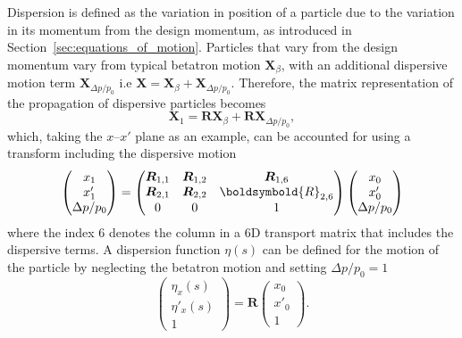 \documentclass[../main.tex]{subfiles}
\begin{document}
Dispersion is defined as the variation in position of a particle due to the variation in its momentum from the design momentum, as introduced in Section~\ref{sec:equations_of_motion}. Particles that vary from the design momentum vary from typical betatron motion $\boldsymbol{X}_{\beta}$, with an additional dispersive motion term $\boldsymbol{X}_{\Delta p/p_{0}}$ i.e $\boldsymbol{X} = \boldsymbol{X}_{\beta} + \boldsymbol{X}_{\Delta p/p_{0}}$. Therefore, the matrix representation of the propagation of dispersive particles becomes
\begin{equation}
\boldsymbol{X}_{1} = \boldsymbol{R}\boldsymbol{X}_{\beta} + \boldsymbol{R}\boldsymbol{X}_{\Delta p/p_{0}},
\label{eq:dispersive_transport_matrix_propagation}    
\end{equation}
which, taking the $x$--$x'$ plane as an example, can be accounted for using a transform including the dispersive motion
\begin{equation}
\begin{pmatrix}
x_{1} \\
x'_{1} \\
\Delta p /p_{0}
\end{pmatrix}
=
\begin{pmatrix}
\boldsymbol{R}_{1,1} & \boldsymbol{R}_{1,2} & \boldsymbol{R}_{1,6} \\
\boldsymbol{R}_{2,1} & \boldsymbol{R}_{2,2} & \boldsymbold{R}_{2,6} \\
0 & 0 & 1
\end{pmatrix}
\begin{pmatrix}
x_{0} \\
x'_{0} \\
\Delta p / p_{0} 
\end{pmatrix}
\label{eq:dispersive_transport_simplified}
\end{equation}
where the index 6 denotes the column in a 6D transport matrix that includes the dispersive terms. A dispersion function $\eta\left(s\right)$ can be defined for the motion of the particle by neglecting the betatron motion and setting $\Delta p/p_{0}=1$
\begin{equation}
\begin{pmatrix}
\eta_{x}\left(s\right) \\
\eta'_{x}\left(s\right) \\
1
\end{pmatrix}
=\boldsymbol{R}
\begin{pmatrix}
x_{0} \\
x'_{0} \\
1
\end{pmatrix}.
\label{eq:dispersion_function}    
\end{equation}
\end{document}
